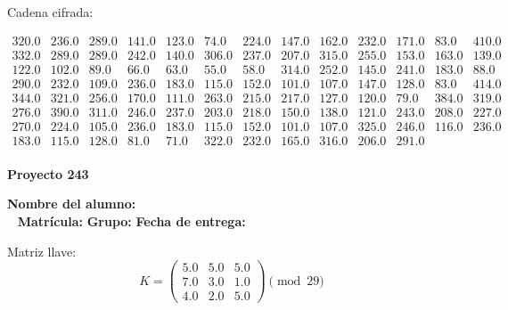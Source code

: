 \documentclass[12pt]{article}
\begin{document}
Cadena cifrada:
\begin{center}
$\begin{array}{lllllllllllll}
320.0 & 236.0 & 289.0 & 141.0 & 123.0 & 74.0 & 224.0 & 147.0 & 162.0 & 232.0 & 171.0 & 83.0 & 410.0\\
332.0 & 289.0 & 289.0 & 242.0 & 140.0 & 306.0 & 237.0 & 207.0 & 315.0 & 255.0 & 153.0 & 163.0 & 139.0\\
122.0 & 102.0 & 89.0 & 66.0 & 63.0 & 55.0 & 58.0 & 314.0 & 252.0 & 145.0 & 241.0 & 183.0 & 88.0\\
290.0 & 232.0 & 109.0 & 236.0 & 183.0 & 115.0 & 152.0 & 101.0 & 107.0 & 147.0 & 128.0 & 83.0 & 414.0\\
344.0 & 321.0 & 256.0 & 170.0 & 111.0 & 263.0 & 215.0 & 217.0 & 127.0 & 120.0 & 79.0 & 384.0 & 319.0\\
276.0 & 390.0 & 311.0 & 246.0 & 237.0 & 203.0 & 218.0 & 150.0 & 138.0 & 121.0 & 243.0 & 208.0 & 227.0\\
270.0 & 224.0 & 105.0 & 236.0 & 183.0 & 115.0 & 152.0 & 101.0 & 107.0 & 325.0 & 246.0 & 116.0 & 236.0\\
183.0 & 115.0 & 128.0 & 81.0 & 71.0 & 322.0 & 232.0 & 165.0 & 316.0 & 206.0 & 291.0\\
\end{array}$
\end{center}

\newpage


\textbf{Proyecto 243}

\textbf{Nombre del alumno:} \underline{\hspace{13cm}}\\\
\vspace{1cm}
\textbf{Matrícula:} \underline{\hspace{4cm}} \hspace{1cm}
\textbf{Grupo:} \underline{\hspace{2cm}}
\textbf{Fecha de entrega:} \underline{\hspace{2cm}}

\medskip

Matriz llave:
\[
K = \begin{pmatrix}
5.0 & 5.0 & 5.0\\
7.0 & 3.0 & 1.0\\
4.0 & 2.0 & 5.0
\end{pmatrix} \pmod{29}
\]
\end{document}
